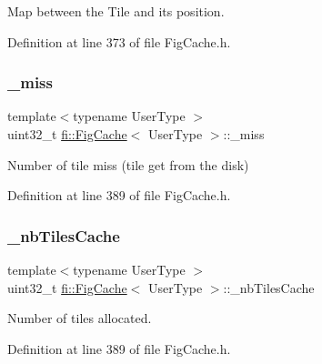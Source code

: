 Map between the Tile and it\textquotesingle{}s position. 



Definition at line 373 of file Fig\+Cache.\+h.

\mbox{\label{classfi_1_1FigCache_a6d215bd51e4ace7e12b34ee6c573af5b}} 
\subsubsection{\texorpdfstring{\+\_\+miss}{\_miss}}
{\footnotesize\ttfamily template$<$typename User\+Type $>$ \\
uint32\+\_\+t \hyperlink{classfi_1_1FigCache}{fi\+::\+Fig\+Cache}$<$ User\+Type $>$\+::\+\_\+miss\hspace{0.3cm}{\ttfamily [private]}}



Number of tile miss (tile get from the disk) 



Definition at line 389 of file Fig\+Cache.\+h.

\mbox{\label{classfi_1_1FigCache_a3f766e4fd7a57c10d0bfa3ba6c4bbdb2}} 
\subsubsection{\texorpdfstring{\+\_\+nb\+Tiles\+Cache}{\_nbTilesCache}}
{\footnotesize\ttfamily template$<$typename User\+Type $>$ \\
uint32\+\_\+t \hyperlink{classfi_1_1FigCache}{fi\+::\+Fig\+Cache}$<$ User\+Type $>$\+::\+\_\+nb\+Tiles\+Cache\hspace{0.3cm}{\ttfamily [private]}}



Number of tiles allocated. 



Definition at line 389 of file Fig\+Cache.\+h.

\mbox{\label{classfi_1_1FigCache_a7abe64041794cdaf6daa4760830cfcf3}} 
